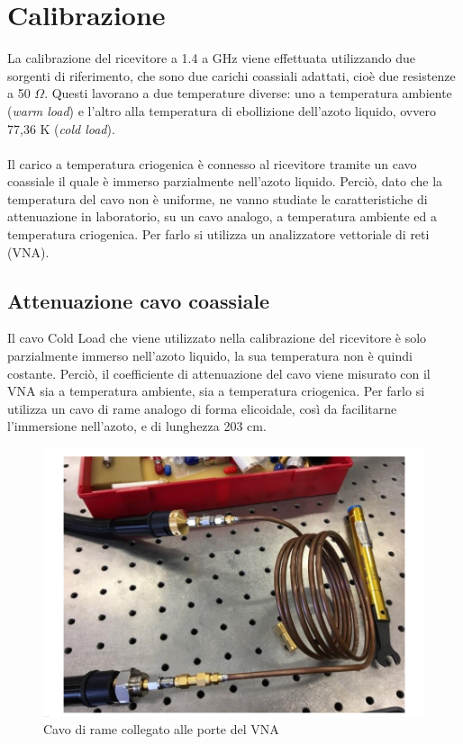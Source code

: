 \section{Calibrazione}
La calibrazione del ricevitore a 1.4 a GHz viene effettuata utilizzando due sorgenti di riferimento, che sono due carichi coassiali adattati, cioè due resistenze a 50 $\Omega$. Questi lavorano a due temperature diverse: uno a temperatura ambiente (\textit{warm load}) e l'altro alla temperatura di ebollizione dell'azoto liquido, ovvero 77,36 K (\textit{cold load}). \\\\Il carico a temperatura criogenica è connesso al ricevitore tramite un cavo coassiale il quale è immerso parzialmente nell'azoto liquido. Perciò, dato che la temperatura del cavo non è uniforme, ne vanno studiate le caratteristiche di attenuazione in laboratorio, su un cavo analogo, a temperatura ambiente ed a temperatura criogenica. Per farlo si utilizza un analizzatore vettoriale di reti (VNA).

\subsection{Attenuazione cavo coassiale}
Il cavo Cold Load che viene utilizzato nella calibrazione del ricevitore è solo parzialmente immerso nell'azoto liquido, la sua temperatura non è quindi costante. Perciò, il coefficiente di attenuazione del cavo viene misurato con il VNA sia a temperatura ambiente, sia a temperatura criogenica. Per farlo si utilizza un cavo di rame analogo di forma elicoidale, così da facilitarne l'immersione nell'azoto, e di lunghezza 203 cm. 
\begin{figure}[h]
\includegraphics[scale=0.60]{cavo rame.png}
\centering
\caption{Cavo di rame collegato alle porte del VNA}
\label{fig:Cavo di rame}
\end{figure}

